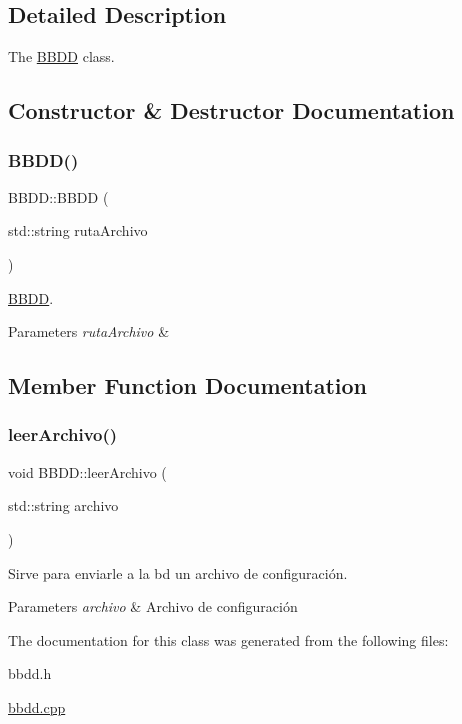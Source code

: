 \subsection{Detailed Description}
The \mbox{\hyperlink{classBBDD}{B\+B\+DD}} class. 

\subsection{Constructor \& Destructor Documentation}
\mbox{\label{classBBDD_af556bed2cf0765466a00bb04a4eb285f}} 
\subsubsection{\texorpdfstring{B\+B\+D\+D()}{BBDD()}}
{\footnotesize\ttfamily B\+B\+D\+D\+::\+B\+B\+DD (\begin{DoxyParamCaption}\item[{std\+::string}]{ruta\+Archivo }\end{DoxyParamCaption})}



\mbox{\hyperlink{classBBDD}{B\+B\+DD}}. 


\begin{DoxyParams}{Parameters}
{\em ruta\+Archivo} & \\
\hline
\end{DoxyParams}


\subsection{Member Function Documentation}
\mbox{\label{classBBDD_a4148c125314b6c3dafcfb25b142f1644}} 
\subsubsection{\texorpdfstring{leer\+Archivo()}{leerArchivo()}}
{\footnotesize\ttfamily void B\+B\+D\+D\+::leer\+Archivo (\begin{DoxyParamCaption}\item[{std\+::string}]{archivo }\end{DoxyParamCaption})}



Sirve para enviarle a la bd un archivo de configuración. 


\begin{DoxyParams}{Parameters}
{\em archivo} & Archivo de configuración \\
\hline
\end{DoxyParams}


The documentation for this class was generated from the following files\+:\begin{DoxyCompactItemize}
\item 
bbdd.\+h\item 
\mbox{\hyperlink{bbdd_8cpp}{bbdd.\+cpp}}\end{DoxyCompactItemize}

